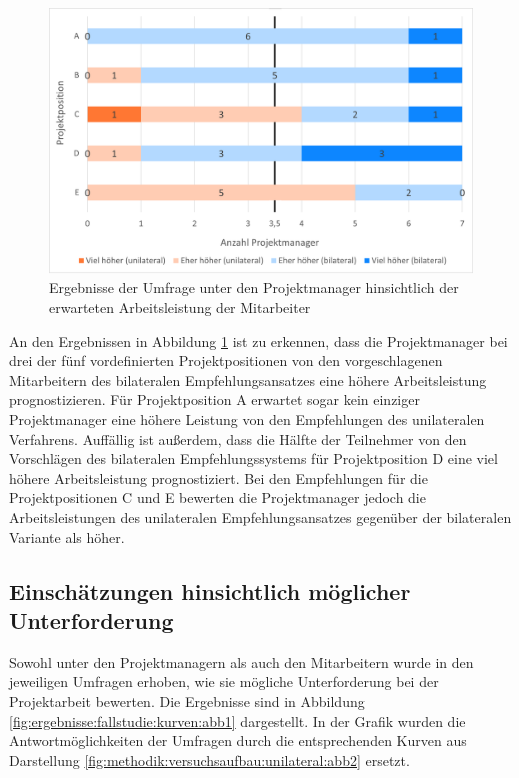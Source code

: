\begin{figure}[h]
	\centering
	\includegraphics[width=1\textwidth]{gfx/ergebnisse-projektmanager-arbeitsleistung.png}	
	\caption{Ergebnisse der Umfrage unter den Projektmanager hinsichtlich der erwarteten Arbeitsleistung der Mitarbeiter}
	\label{fig:ergebnisse:fallstudie:arbeitsleistung:abb1}
\end{figure}

An den Ergebnissen in Abbildung \ref{fig:ergebnisse:fallstudie:arbeitsleistung:abb1} ist zu erkennen, dass die Projektmanager bei drei der fünf vordefinierten Projektpositionen von den vorgeschlagenen Mitarbeitern des bilateralen Empfehlungsansatzes eine höhere Arbeitsleistung prognostizieren. Für Projektposition A erwartet sogar kein einziger Projektmanager eine höhere Leistung von den Empfehlungen des unilateralen Verfahrens. Auffällig ist außerdem, dass die Hälfte der Teilnehmer von den Vorschlägen des bilateralen Empfehlungssystems für Projektposition D eine viel höhere Arbeitsleistung prognostiziert. Bei den Empfehlungen für die Projektpositionen C und E bewerten die Projektmanager jedoch die Arbeitsleistungen des unilateralen Empfehlungsansatzes gegenüber der bilateralen Variante als höher.
\newpage
\subsection{Einschätzungen hinsichtlich möglicher Unterforderung}
\label{ch:ergebnisse:fallstudie:kurven}
Sowohl unter den Projektmanagern als auch den Mitarbeitern wurde in den jeweiligen Umfragen erhoben, wie sie mögliche Unterforderung bei der Projektarbeit bewerten. Die Ergebnisse sind in Abbildung \ref{fig:ergebnisse:fallstudie:kurven:abb1} dargestellt. In der Grafik wurden die Antwortmöglichkeiten der Umfragen durch die entsprechenden Kurven aus Darstellung \ref{fig:methodik:versuchsaufbau:unilateral:abb2} ersetzt.

